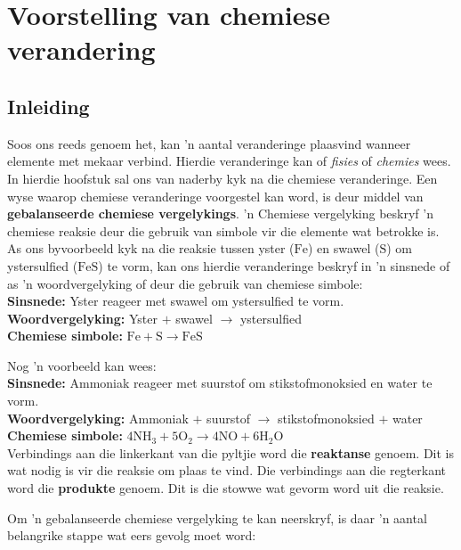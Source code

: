  \chapter{Voorstelling van che\-mie\-se ver\-an\-de\-ring}
    \label{337cc49099d6e82169c54b5d0fc3878f}
         \section{Inleiding}
    \nopagebreak

Soos ons reeds genoem het, kan 'n aantal veranderinge plaasvind wanneer elemente met mekaar verbind. Hierdie veranderinge kan of \textsl{fisies} of \textsl{chemies} wees. In hierdie hoofstuk sal ons van naderby kyk na die chemiese veranderinge. Een wyse waarop chemiese veranderinge voorgestel kan word, is deur middel van \textbf{gebalanseerde chemiese vergelykings}. 'n Chemiese vergelyking beskryf 'n chemiese reaksie deur die gebruik van simbole vir die elemente wat betrokke is. As ons byvoorbeeld kyk na die reaksie tussen yster ($\text{Fe}$) en swawel ($\text{S}$) om ystersulfied ($\text{FeS}$) te vorm, kan ons hierdie veranderinge beskryf in 'n sinsnede of as 'n woordvergelyking of deur die gebruik van chemiese simbole:\\
 \textbf{Sinsnede:} Yster reageer met swawel om ystersulfied te vorm.\\
 \textbf{Woordvergelyking:} Yster $+$ swawel $\to$ ystersulfied \\
 \textbf{Chemiese simbole:} $\text{Fe} + \text{S} \to \text{FeS}$\par
Nog 'n voorbeeld kan wees:\\
\textbf{Sinsnede:} Ammoniak reageer met suurstof om stikstofmonoksied en water te vorm.\\ 
\textbf{Woordvergelyking:} Ammoniak $+$ suurstof $\to$ stikstofmonoksied $+$ water\\
\textbf{Chemiese simbole:} $4{\text{NH}}_{3} + 5{\text{O}}_{2} \to 4\text{NO} + 6{\text{H}}_{2}\text{O}$\\
Verbindings aan die linkerkant van die pyltjie word die \textbf{reaktanse} genoem. Dit is wat nodig is vir die
reaksie om plaas te vind. Die verbindings aan die regterkant word die \textbf{produkte} genoem. Dit is die stowwe wat gevorm word uit die reaksie.\par 
Om 'n gebalanseerde chemiese vergelyking te kan neerskryf, is daar 'n aantal belangrike stappe
wat eers gevolg moet word: 
